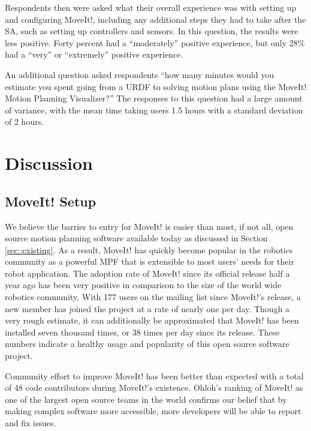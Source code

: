 \documentclass[10pt,journal,compsoc]{joser1}
\begin{document}
{Respondents then were asked what their overall experience was with setting up and configuring MoveIt!, including any additional steps they had to take after the SA, such as setting up controllers and sensors. In this question, the results were less positive. Forty percent had a ``moderately'' positive experience, but only 28\% had a ``very'' or ``extremely'' positive experience. 

An additional question asked respondents ``how many minutes would you estimate you spent going from a URDF to solving motion plans using the MoveIt! Motion Planning Visualizer?'' The responses to this question had a large amount of variance, with the mean time taking users 1.5 hours with a standard deviation of 2 hours.



\section{Discussion}
\label{sec::discussion}

\subsection{MoveIt! Setup}
\label{sec::moveit_discussion}

We believe the barrier to entry for MoveIt! is easier than most, if not all, open source motion planning software available today as discussed in Section \ref{sec::existing}. As a result, MoveIt! has quickly become popular in the robotics community as a powerful MPF that is extensible to most users' needs for their robot application. The adoption rate of MoveIt! since its official release half a year ago has been very positive in comparison to the size of the world wide robotics community. With 177 users on the mailing list since MoveIt!'s release, a new member has joined the project at a rate of nearly one per day. Though a very rough estimate, it can additionally be approximated that MoveIt! has been installed seven thousand times, or 38 times per day since its release. These numbers indicate a healthy usage and popularity of this open source software project.

Community effort to improve MoveIt! has been better than expected with a total of 48 code contributors during MoveIt!'s existence. Ohloh's ranking of MoveIt! as one of the largest open source teams in the world confirms our belief that by making complex software more accessible, more developers will be able to report and fix issues. 

}
\end{document}
